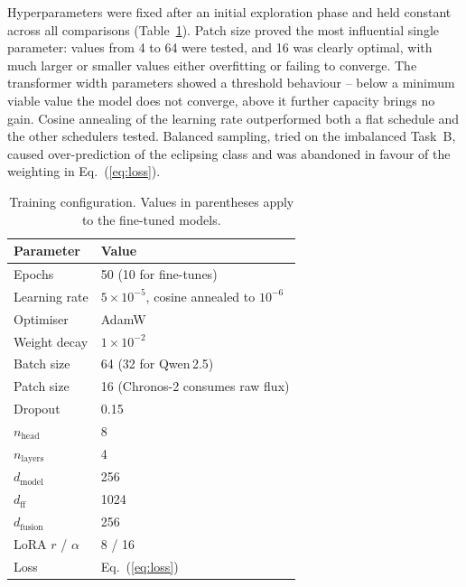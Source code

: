 \documentclass{aa}
\begin{document}
    Hyperparameters were fixed after an initial exploration phase and held constant across
    all comparisons (Table~\ref{tab:hyper}). Patch size proved the most influential single
    parameter: values from 4 to 64 were tested, and 16 was clearly optimal, with much larger
    or smaller values either overfitting or failing to converge. The transformer width
    parameters showed a threshold behaviour -- below a minimum viable value the model does
    not converge, above it further capacity brings no gain. Cosine annealing of the learning
    rate outperformed both a flat schedule and the other schedulers tested. Balanced
    sampling, tried on the imbalanced Task~B, caused over-prediction of the eclipsing class
    and was abandoned in favour of the weighting in Eq.~(\ref{eq:loss}).

    \begin{table}[!t]
        \caption{Training configuration. Values in parentheses apply to the fine-tuned models.}
        \label{tab:hyper}
        \centering
        \small
        \begin{tabular}{ll}
            \toprule
            Parameter             & Value                                          \\
            \midrule
            Epochs                & 50 (10 for fine-tunes)                         \\
            Learning rate         & $5\times10^{-5}$, cosine annealed to $10^{-6}$ \\
            Optimiser             & AdamW                                          \\
            Weight decay          & $1\times10^{-2}$                               \\
            Batch size            & 64 (32 for Qwen\,2.5)                          \\
            Patch size            & 16 (Chronos-2 consumes raw flux)               \\
            Dropout               & 0.15                                           \\
            $n_{\mathrm{head}}$   & 8                                              \\
            $n_{\mathrm{layers}}$ & 4                                              \\
            $d_{\mathrm{model}}$  & 256                                            \\
            $d_{\mathrm{ff}}$     & 1024                                           \\
            $d_{\mathrm{fusion}}$ & 256                                            \\
            LoRA $r$ / $\alpha$   & 8 / 16                                         \\
            Loss                  & Eq.~(\ref{eq:loss})                            \\
            \bottomrule
        \end{tabular}
    \end{table}
\end{document}
